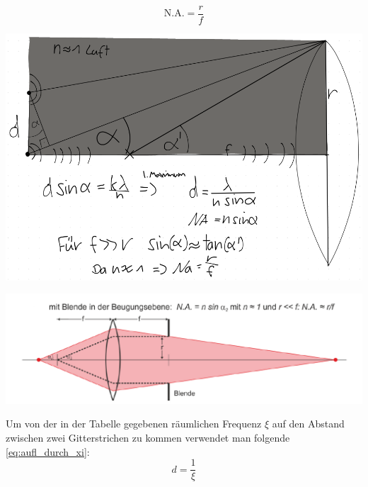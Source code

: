 \documentclass[11pt,ngerman]{scrartcl}
\begin{document}
\begin{equation}
	\mathrm{N.A.} = \frac{r}{f}
	\label{eq:na_approx}
\end{equation}

\begin{center}
	\begin{minipage}[t]{0.50\textwidth}
		\centering
		\includegraphics[width=\textwidth]{pics/abbeabbildung_skizze}
		\label{fig:abbildungs_skizze}
	\end{minipage}
\end{center}

\begin{center}
	\begin{minipage}[t]{\textwidth}
		\includegraphics[width=\textwidth]{b}
		\label{fig:na_naherung}
	\end{minipage}
\end{center}

\noindent Um von der in der Tabelle gegebenen räumlichen Frequenz $\xi$ auf den Abstand zwischen zwei Gitterstrichen
zu kommen verwendet man folgende \autoref{eq:aufl_durch_xi}:
\begin{equation}
	d = \frac{1}{\xi}
	\label{eq:aufl_durch_xi}
\end{equation}
\end{document}
